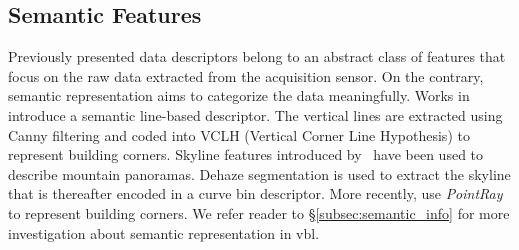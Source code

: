 	\subsection{Semantic Features}		
	\label{subsec:semantic_representation}
		Previously presented data descriptors belong to an abstract class of features that focus on the raw data extracted from the acquisition sensor. On the contrary, semantic representation aims to categorize the data meaningfully. Works in~\citep{Cham2010} introduce a semantic line-based descriptor. The vertical lines are extracted using Canny filtering and coded into VCLH (Vertical Corner Line Hypothesis) to represent building corners. Skyline features introduced by~\citet{Baatz2012} have been used to describe mountain panoramas. Dehaze segmentation is used to extract the skyline that is thereafter encoded in a curve bin descriptor. More recently, \citet{Bansal2014} use \textit{PointRay} to represent building corners. We refer reader to \S\ref{subsec:semantic_info} for more investigation about semantic representation in \ac{vbl}.